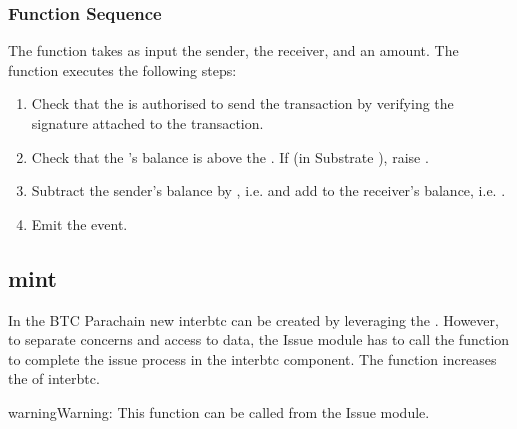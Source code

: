 \documentclass[a4paper,10pt,english]{sphinxmanual}
\begin{document}
\subsubsection{Function Sequence}
\label{\detokenize{spec/treasury:function-sequence}}
The  function takes as input the sender, the receiver, and an amount. The function executes the following steps:
\begin{enumerate}
%
\item {} 
Check that the  is authorised to send the transaction by verifying the signature attached to the transaction.

\item {} 
Check that the ’s balance is above the . If  (in Substrate ), raise .

\item {} 
Subtract the sender’s balance by , i.e.  and add  to the receiver’s balance, i.e. .

\item {} 
Emit the  event.

\end{enumerate}


\subsection{mint}
\label{\detokenize{spec/treasury:mint}}\label{\detokenize{spec/treasury:id2}}
In the BTC Parachain new interbtc can be created by leveraging the {\hyperref[\detokenize{spec/issue:issue-protocol}]{}}.
However, to separate concerns and access to data, the Issue module has to call the  function to complete the issue process in the interbtc component.
The function increases the  of interbtc.

\begin{sphinxadmonition}{warning}{Warning:}
This function can  be called from the Issue module.
\end{sphinxadmonition}
\end{document}
